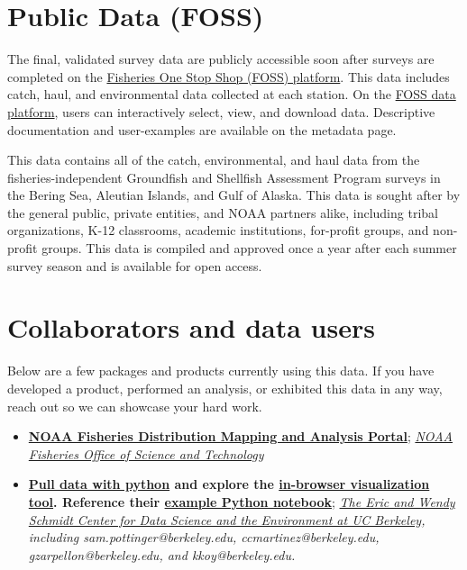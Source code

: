 \documentclass[
  letterpaper,
  oneside,
  open=any]{scrbook}
\begin{document}
\part{Public Data (FOSS)}

The final, validated survey data are publicly accessible soon after
surveys are completed on the
\href{https://www.fisheries.noaa.gov/foss/}{Fisheries One Stop Shop
(FOSS) platform}. This data includes catch, haul, and environmental data
collected at each station. On the
\href{https://www.fisheries.noaa.gov/foss/}{FOSS data platform}, users
can interactively select, view, and download data. Descriptive
documentation and user-examples are available on the metadata page.

This data contains all of the catch, environmental, and haul data from
the fisheries-independent Groundfish and Shellfish Assessment Program
surveys in the Bering Sea, Aleutian Islands, and Gulf of Alaska. This
data is sought after by the general public, private entities, and NOAA
partners alike, including tribal organizations, K-12 classrooms,
academic institutions, for-profit groups, and non-profit groups. This
data is compiled and approved once a year after each summer survey
season and is available for open access.

\part{Collaborators and data users}

Below are a few packages and products currently using this data. If you
have developed a product, performed an analysis, or exhibited this data
in any way, reach out so we can showcase your hard work.

\begin{itemize}
\item
  \textbf{\href{https://apps-st.fisheries.noaa.gov/dismap}{NOAA
  Fisheries Distribution Mapping and Analysis Portal}};
  \emph{\href{https://www.fisheries.noaa.gov/contact/office-science-and-technology}{NOAA
  Fisheries Office of Science and Technology}}
\item
  \textbf{\href{https://pyafscgap.org/}{Pull data with python} and
  explore the
  \href{https://app.pyafscgap.org/\textquotesingle{}}{in-browser
  visualization tool}. Reference their
  \href{https://mybinder.org/v2/gh/SchmidtDSE/afscgap/main?urlpath=/tree/index.ipynb}{example
  Python notebook}}; \emph{\href{https://dse.berkeley.edu/}{The Eric and
  Wendy Schmidt Center for Data Science and the Environment at UC
  Berkeley}, including sam.pottinger@berkeley.edu,
  ccmartinez@berkeley.edu, gzarpellon@berkeley.edu, and
  kkoy@berkeley.edu.}
\end{itemize}
\end{document}
